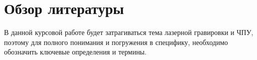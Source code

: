 \section{Обзор литературы}
\label{sec:literature}

В данной курсовой работе будет затрагиваться тема лазерной гравировки и ЧПУ, поэтому для полного понимания и погружения в специфику, 
необходимо обозначить ключевые определения и термины.




